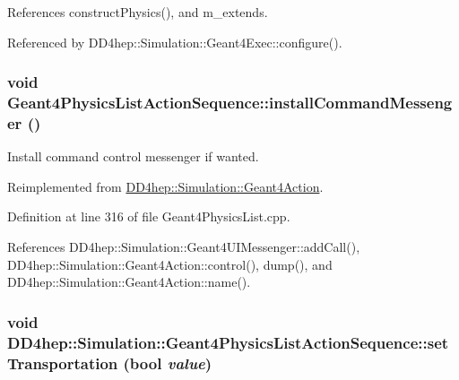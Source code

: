 References constructPhysics(), and m\_\-extends.

Referenced by DD4hep::Simulation::Geant4Exec::configure().\hypertarget{class_d_d4hep_1_1_simulation_1_1_geant4_physics_list_action_sequence_a9c60c66de8a46726b0b3d781042c22a6}{
\subsubsection[{installCommandMessenger}]{\setlength{\rightskip}{0pt plus 5cm}void Geant4PhysicsListActionSequence::installCommandMessenger ()}}
\label{class_d_d4hep_1_1_simulation_1_1_geant4_physics_list_action_sequence_a9c60c66de8a46726b0b3d781042c22a6}


Install command control messenger if wanted. 

Reimplemented from \hyperlink{class_d_d4hep_1_1_simulation_1_1_geant4_action_aaaa0718b7d4f52e4c31e982b91c0eeda}{DD4hep::Simulation::Geant4Action}.

Definition at line 316 of file Geant4PhysicsList.cpp.

References DD4hep::Simulation::Geant4UIMessenger::addCall(), DD4hep::Simulation::Geant4Action::control(), dump(), and DD4hep::Simulation::Geant4Action::name().\hypertarget{class_d_d4hep_1_1_simulation_1_1_geant4_physics_list_action_sequence_a0572d68ab6ffc8a826a84a4ae56f4327}{
\subsubsection[{setTransportation}]{\setlength{\rightskip}{0pt plus 5cm}void DD4hep::Simulation::Geant4PhysicsListActionSequence::setTransportation (bool {\em value})}}
\label{class_d_d4hep_1_1_simulation_1_1_geant4_physics_list_action_sequence_a0572d68ab6ffc8a826a84a4ae56f4327}


